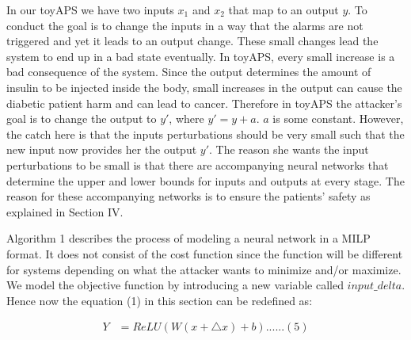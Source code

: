 In our toyAPS we have two inputs $x_1$ and $x_2$ that map to an output $y$. To conduct \attack the goal is to change the inputs in a way that the alarms are not triggered and yet it leads to an output change. These small changes lead the system to end up in a bad state eventually. In toyAPS, every small increase is a bad consequence of the system. Since the output determines the amount of insulin to be injected inside the body, small increases in the output can cause the diabetic patient harm \cite{ZHANG2019403} and can lead to cancer. 
Therefore in toyAPS the attacker's goal is to change the output to $y'$, where $y' = y + a$. $a$ is some constant. %
However, the catch here is that the inputs perturbations should be very small such that the new input now provides her the output $y'$.  The reason she wants the input perturbations to be small is that there are accompanying neural networks that determine the upper and lower bounds for inputs and outputs at every stage. The reason for these accompanying networks is to ensure the patients' safety as explained in Section IV.%

Algorithm 1 describes the process of modeling a neural network in a MILP format. It does not consist of the cost function since the function will be different for systems depending on what the attacker wants to minimize and/or maximize. We model the objective function by introducing a new variable called $input\_delta$. Hence now the equation (1) in this section can be redefined as:

\begin{align}
Y &=  ReLU(W(x + \bigtriangleup  x ) + b) ...... (5)
\end{align}

